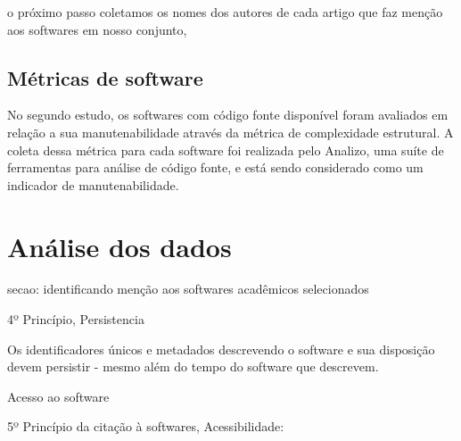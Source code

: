 % 
% 
% 
% 
% 

%

o próximo passo coletamos os nomes dos autores de cada artigo que faz menção
aos softwares em nosso conjunto, 

\subsection{Métricas de software}


No segundo estudo, os softwares com código fonte disponível foram avaliados em
relação a sua manutenabilidade através da métrica de complexidade estrutural. A
coleta dessa métrica para cada software foi realizada pelo Analizo, uma suíte
de ferramentas para análise de código fonte, e está sendo considerado como um
indicador de manutenabilidade.

\section{Análise dos dados}

secao: identificando menção aos softwares acadêmicos selecionados

4º Princípio, Persistencia

Os identificadores únicos e metadados descrevendo o software e sua disposição
devem persistir - mesmo além do tempo do software que descrevem.

Acesso ao software

5º Princípio da citação à softwares, Acessibilidade:

